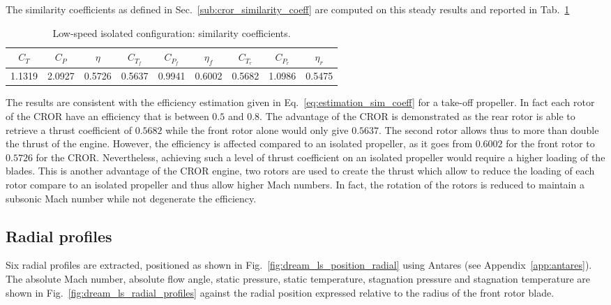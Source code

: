 The similarity coefficients as defined in 
Sec.~\ref{sub:cror_similarity_coeff} are computed on
this steady results and reported in Tab.~\ref{tab:dream_ls_sim_coeff}
\begin{table}
   \centering
  \begin{tabular}{ccc|cccccc}
    \toprule
    $C_T$ & $C_P$ & $\eta$ & $C_{T_f}$ & $C_{P_f}$ & $\eta_f$ & $C_{T_r}$ & $C_{P_r}$ & $\eta_r$ \\
    \midrule
    1.1319 & 2.0927 & 0.5726 & 0.5637 & 0.9941 &  0.6002 & 0.5682 & 1.0986 &  0.5475 \\
    \bottomrule
  \end{tabular}
  \caption{Low-speed isolated configuration: similarity coefficients.}
  \label{tab:dream_ls_sim_coeff}
\end{table}
The results are consistent with the efficiency estimation given in 
Eq.~\eqref{eq:estimation_sim_coeff} for a take-off propeller.
In fact each rotor of the CROR have an efficiency that is between $0.5$
and $0.8$. The advantage of the CROR is demonstrated as the rear
rotor is able to retrieve a thrust coefficient of $0.5682$ while
the front rotor alone would only give $0.5637$.
The second rotor allows thus to more than double the thrust of the engine.
However, the efficiency is affected compared to an isolated propeller, as
it goes from $0.6002$ for the front rotor to $0.5726$ for the CROR.
Nevertheless, achieving such a level of thrust coefficient on an isolated
propeller would require a higher loading of the blades. This is another advantage 
of the CROR engine, two rotors are used to create the thrust which allow to
reduce the loading of each rotor compare to an isolated propeller and thus
allow higher Mach numbers. In fact, the rotation of the rotors is reduced 
to maintain a subsonic Mach number while not degenerate the efficiency.


\subsection{Radial profiles}
\label{sub:dream_ls_radial_profiles}

Six radial profiles are extracted,
positioned as shown in Fig.~\ref{fig:dream_ls_position_radial}
using Antares (see Appendix~\ref{app:antares}). The absolute
Mach number, absolute flow angle, static pressure, static
temperature, stagnation pressure and stagnation temperature
are shown in Fig.~\ref{fig:dream_ls_radial_profiles}
against the radial position expressed
relative to the radius of the front rotor blade.

